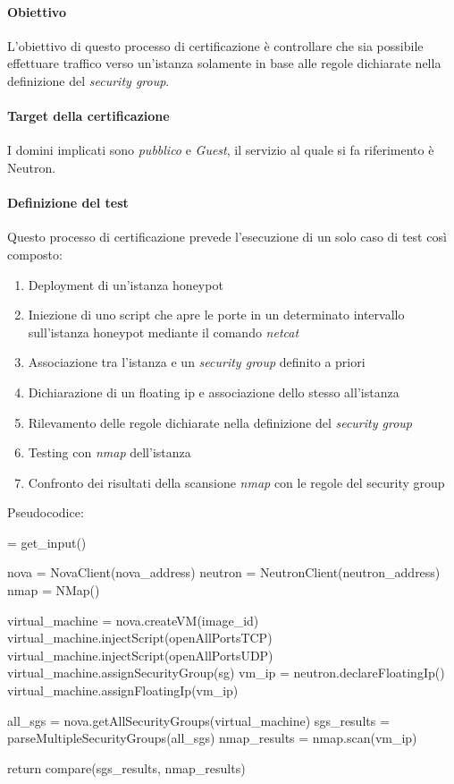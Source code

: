 \documentclass[../main.tex]{subfiles}
\begin{document}
\paragraph{Obiettivo}
L'obiettivo di questo processo di certificazione è controllare che sia possibile effettuare traffico verso un'istanza solamente in base alle regole dichiarate nella definizione del \textit{security group}.

\paragraph{Target della certificazione}
I domini implicati sono \textit{pubblico} e \textit{Guest}, il servizio al quale si fa riferimento è Neutron.

\paragraph{Definizione del test}
Questo processo di certificazione prevede l'esecuzione di un solo caso di test così composto:
\begin{enumerate}
\item Deployment di un'istanza honeypot
\item Iniezione di uno script che apre le porte in un determinato intervallo sull'istanza honeypot mediante il comando \textit{netcat}
\item Associazione tra l'istanza e un \textit{security group} definito a priori
\item Dichiarazione di un floating ip e associazione dello stesso all'istanza
\item Rilevamento delle regole dichiarate nella definizione del \textit{security group}
\item Testing con \textit{nmap} dell'istanza
\item Confronto dei risultati della scansione \textit{nmap} con le regole del security group
\end{enumerate}

Pseudocodice:

\begin{python}
 = get_input()

nova = NovaClient(nova_address)
neutron = NeutronClient(neutron_address)
nmap = NMap()

virtual_machine = nova.createVM(image_id)
virtual_machine.injectScript(openAllPortsTCP)
virtual_machine.injectScript(openAllPortsUDP)
virtual_machine.assignSecurityGroup(sg)
vm_ip = neutron.declareFloatingIp()
virtual_machine.assignFloatingIp(vm_ip)

all_sgs = nova.getAllSecurityGroups(virtual_machine)
sgs_results = parseMultipleSecurityGroups(all_sgs)
nmap_results = nmap.scan(vm_ip)

return compare(sgs_results, nmap_results)
\end{python}
\end{document}
